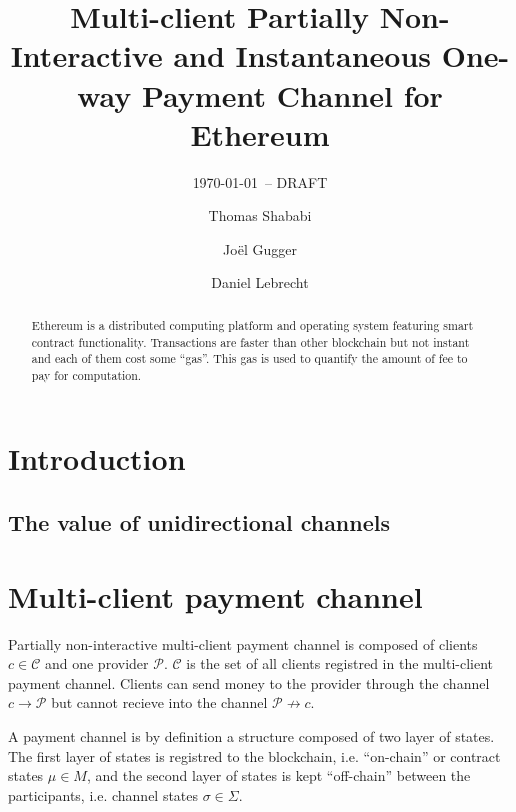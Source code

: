 \documentclass{llncs}
\begin{document}
\title{Multi-client Partially Non-Interactive and Instantaneous One-way Payment Channel for Ethereum}
\author{Thomas Shababi \and Jo\"el Gugger \and Daniel Lebrecht}

\subtitle{{\normalsize\today{\small\ -- DRAFT}}}

\maketitle

\begin{abstract} Ethereum is a distributed computing platform and operating system featuring smart contract functionality. Transactions are faster than other blockchain but not instant and each of them cost some ``gas''. This gas is used to quantify the amount of fee to pay for computation. 
\end{abstract}

\section{Introduction} 
\subsection{The value of unidirectional channels}

\section{Multi-client payment channel} Partially non-interactive multi-client payment channel is composed of clients $c \in \mathcal{C}$ and one provider $\mathcal{P}$. $\mathcal{C}$ is the set of all clients registred in the multi-client payment channel. Clients can send money to the provider through the channel $c \rightarrow \mathcal{P}$ but cannot recieve into the channel $\mathcal{P} \not\rightarrow c$.

A payment channel is by definition a structure composed of two layer of states. The first layer of states is registred to the blockchain, i.e. ``on-chain'' or contract states $\mu \in M$, and the second layer of states is kept ``off-chain'' between the participants, i.e. channel states $\sigma \in \Sigma$.
\end{document}
